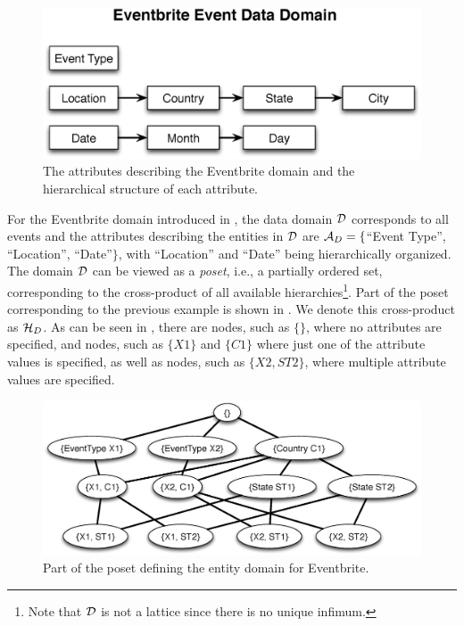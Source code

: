 \begin{figure}[h]
	\begin{center}
	\includegraphics[clip,scale=0.33]{figs/eventsDomain.eps}
	\vspace{-10pt}
	\caption{The attributes describing the Eventbrite domain and the hierarchical structure of each attribute.}
	\label{fig:eventsdomain}
	\end{center}
	\vspace{-20pt}
\end{figure}
\fi
\ifpaper
For the Eventbrite domain introduced in , the data domain $\mathcal{D}$ corresponds to all events and the attributes describing the entities in $\mathcal{D}$ are $\mathcal{A}_D = \{$``Event Type'', ``Location'', ``Date''$\}$, with ``Location'' and ``Date'' being hierarchically organized.
\fi
The domain $\mathcal{D}$ can be viewed as a {\em poset}, i.e., a partially ordered set, corresponding to the cross-product of all available hierarchies\footnote{Note that $\mathcal{D}$ is not a lattice since there is no unique infimum.}. Part of the poset corresponding to the previous example is shown in . We denote this cross-product as $\mathcal{H}_D$. As can be seen in , there are nodes, such as $\{\}$, where no attributes are specified, and nodes, such as $\{X1\}$ and $\{C1\}$ where just one of the attribute values is specified, as well as nodes, such as $\{X2, ST2\}$, where multiple attribute values are specified.

\begin{figure}[h]
\vspace{-10pt}
	\begin{center}
	\includegraphics[clip,scale=0.25]{figs/eventsExLattice.eps}
	\vspace{-10pt}
	\caption{Part of the poset defining the entity domain for Eventbrite.}
	\label{fig:eventslattice}
	\end{center}
	\vspace{-20pt}
\end{figure}


